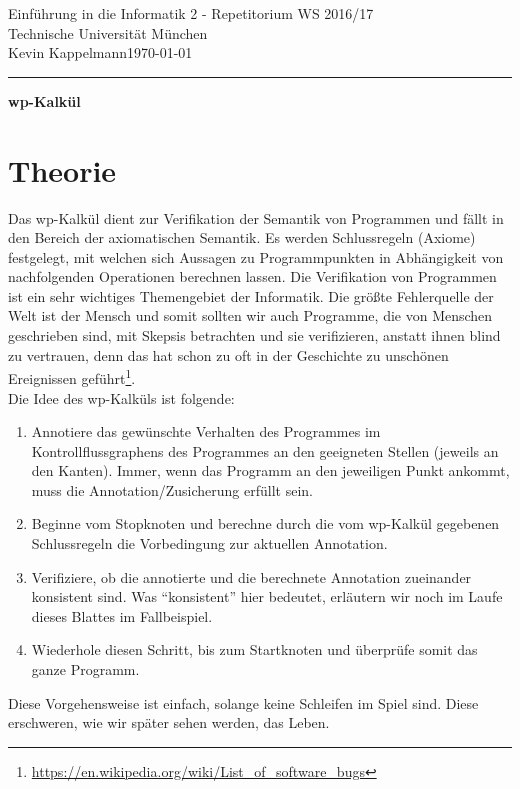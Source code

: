 \documentclass[hidelinks]{article}
\theoremstyle{plain}
\theoremstyle{definition}
\theoremstyle{rem}
\begin{document}

\begin{sloppypar}
\begingroup  
  \LARGE Einführung in die Informatik 2 - Repetitorium WS 2016/17\\Technische Universität München\\[0.5em]
  \large{Kevin Kappelmann\hfill \today}\\
\endgroup
\hrule height 1pt
{\LARGE{{\begin{center}\textbf{wp-Kalkül}\end{center}}}}
\section{Theorie}
Das wp-Kalkül dient zur Verifikation der Semantik von Programmen und fällt in den Bereich der axiomatischen Semantik. Es werden Schlussregeln (Axiome) festgelegt, mit welchen sich Aussagen zu Programmpunkten in Abhängigkeit von nachfolgenden Operationen berechnen lassen.
	Die Verifikation von Programmen ist ein sehr wichtiges Themengebiet der Informatik. Die größte Fehlerquelle der Welt ist der Mensch und somit sollten wir auch Programme, die von Menschen geschrieben sind, mit Skepsis betrachten und sie verifizieren, anstatt ihnen blind zu vertrauen, denn das hat schon zu oft in der Geschichte zu unschönen Ereignissen geführt\footnote{\url{https://en.wikipedia.org/wiki/List\_of\_software\_bugs}}.\\
Die Idee des wp-Kalküls ist folgende:
\begin{enumerate}
\item Annotiere das gewünschte Verhalten des Programmes im Kontrollflussgraphens des Programmes an den geeigneten Stellen (jeweils an den Kanten). Immer, wenn das Programm an den jeweiligen Punkt ankommt, muss die Annotation/Zusicherung erfüllt sein.
\item Beginne vom Stopknoten und berechne durch die vom wp-Kalkül gegebenen Schlussregeln die Vorbedingung zur aktuellen Annotation.
\item Verifiziere, ob die annotierte und die berechnete Annotation zueinander konsistent sind. Was ``konsistent'' hier bedeutet, erläutern wir noch im Laufe dieses Blattes im Fallbeispiel.
\item Wiederhole diesen Schritt, bis zum Startknoten und überprüfe somit das ganze Programm.
\end{enumerate}
Diese Vorgehensweise ist einfach, solange keine Schleifen im Spiel sind. Diese erschweren, wie wir später sehen werden, das Leben.

\end{sloppypar}
\end{document}
